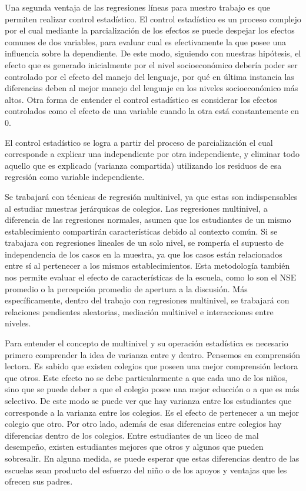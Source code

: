 \documentclass[12pt,twoside]{templates/facsothesis}
\begin{document}
Una segunda ventaja de las regresiones líneas para nuestro trabajo es que permiten realizar control estadístico. El control estadístico es un proceso complejo por el cual mediante la parcialización de los efectos se puede despejar los efectos comunes de dos variables, para evaluar cual es efectivamente la que posee una influencia sobre la dependiente. De este modo, siguiendo con nuestras hipótesis, el efecto que es generado inicialmente por el nivel socioeconómico debería poder ser controlado por el efecto del manejo del lenguaje, por qué en última instancia las diferencias deben al mejor manejo del lenguaje en los niveles socioeconómico más altos. Otra forma de entender el control estadístico es considerar los efectos controlados como el efecto de una variable cuando la otra está constantemente en 0.

El control estadístico se logra a partir del proceso de parcialización el cual corresponde a explicar una independiente por otra independiente, y eliminar todo aquello que es explicado (varianza compartida) utilizando los residuos de esa regresión como variable independiente.

Se trabajará con técnicas de regresión multinivel, ya que estas son indispensables al estudiar muestras jerárquicas de colegios. Las regresiones multinivel, a diferencia de las regresiones normales, asumen que los estudiantes de un mismo establecimiento compartirán características debido al contexto común. Si se trabajara con regresiones lineales de un solo nivel, se rompería el supuesto de independencia de los casos en la muestra, ya que los casos están relacionados entre sí al pertenecer a los mismos establecimientos. Esta metodología también nos permite evaluar el efecto de características de la escuela, como lo son el NSE promedio o la percepción promedio de apertura a la discusión. Más específicamente, dentro del trabajo con regresiones multinivel, se trabajará con relaciones pendientes aleatorias, mediación multinivel e interacciones entre niveles.

Para entender el concepto de multinivel y su operación estadística es necesario primero comprender la idea de varianza entre y dentro. Pensemos en comprensión lectora. Es sabido que existen colegios que poseen una mejor comprensión lectora que otros. Este efecto no se debe particularmente a que cada uno de los niños, sino que se puede deber a que el colegio posee una mejor educción o a que es más selectivo. De este modo se puede ver que hay varianza entre los estudiantes que corresponde a la varianza entre los colegios. Es el efecto de pertenecer a un mejor colegio que otro. Por otro lado, además de esas diferencias entre colegios hay diferencias dentro de los colegios. Entre estudiantes de un liceo de mal desempeño, existen estudiantes mejores que otros y algunos que pueden sobresalir. En alguna medida, se puede esperar que estas diferencias dentro de las escuelas sean producto del esfuerzo del niño o de los apoyos y ventajas que les ofrecen sus padres.
\end{document}
